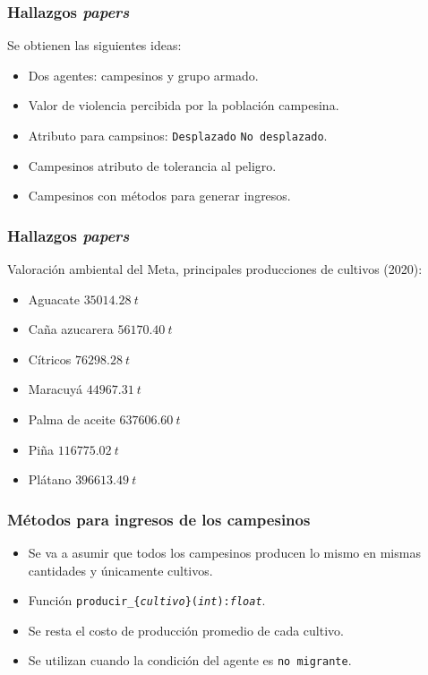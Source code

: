 \documentclass[17pt, t, lualatex]{beamer}
\begin{document}
\begin{frame}[allowframebreaks]
  \frametitle{Hallazgos \textit{papers}}
  Se obtienen las siguientes ideas:
  \begin{itemize}
    \item Dos agentes: campesinos y grupo armado.
    \item Valor de violencia percibida por la población campesina.
    \item Atributo para campsinos: \texttt{Desplazado} \texttt{No desplazado}.
    \item Campesinos atributo de tolerancia al peligro.
    \item Campesinos con métodos para generar ingresos.
  \end{itemize}
\end{frame}

\begin{frame}[allowframebreaks]
  \frametitle{Hallazgos \textit{papers}}
  
  Valoración ambiental del Meta\cite{EVA2020}, principales producciones de cultivos (2020):
  
  \begin{itemize}
    \item Aguacate $35014.28\ t$ 
    \item Caña azucarera $56170.40\ t$
    \item Cítricos $76298.28\ t$
    \item Maracuyá $44967.31\ t$
    \item Palma de aceite $637606.60\ t$
    \item Piña $116775.02\ t$
    \item Plátano $396613.49\ t$
  \end{itemize}


\end{frame}

\begin{frame}[allowframebreaks]
  \frametitle{Métodos para ingresos de los campesinos}
  

  \begin{itemize}
    \item Se va a asumir que todos los campesinos producen lo mismo en mismas cantidades y únicamente cultivos. 
    \item Función \texttt{producir\_\{\textit{cultivo}\}(\textit{int}):\textit{float}}.
    \item Se resta el costo de producción promedio de cada cultivo.
    \item Se utilizan cuando la condición del agente es \texttt{no migrante}.
  \end{itemize}


\end{frame}
\end{document}
